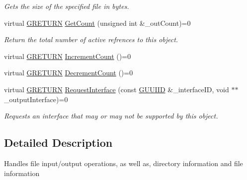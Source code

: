 \begin{DoxyCompactItemize}
\begin{DoxyCompactList}\small\item\em Gets the size of the specified file in bytes. \end{DoxyCompactList}\item 
\hypertarget{class_g_w_1_1_c_o_r_e_1_1_g_interface_a80f212dcdf60202cf9da49405863d1d5}{}\label{class_g_w_1_1_c_o_r_e_1_1_g_interface_a80f212dcdf60202cf9da49405863d1d5} 
virtual \hyperlink{namespace_g_w_a69b1aaebac1cac8049825f035884c95b}{G\+R\+E\+T\+U\+RN} \hyperlink{class_g_w_1_1_c_o_r_e_1_1_g_interface_a80f212dcdf60202cf9da49405863d1d5}{Get\+Count} (unsigned int \&\+\_\+out\+Count)=0
\begin{DoxyCompactList}\small\item\em Return the total number of active refrences to this object. \end{DoxyCompactList}\item 
virtual \hyperlink{namespace_g_w_a69b1aaebac1cac8049825f035884c95b}{G\+R\+E\+T\+U\+RN} \hyperlink{class_g_w_1_1_c_o_r_e_1_1_g_interface_a3e04e58eef4f3e3f56ff7fb751194c37}{Increment\+Count} ()=0
\item 
virtual \hyperlink{namespace_g_w_a69b1aaebac1cac8049825f035884c95b}{G\+R\+E\+T\+U\+RN} \hyperlink{class_g_w_1_1_c_o_r_e_1_1_g_interface_af6924e12b14f217b518fc91c63d9703d}{Decrement\+Count} ()=0
\item 
\hypertarget{class_g_w_1_1_c_o_r_e_1_1_g_interface_ab1414aa07bca310a824ee01a91657ad0}{}\label{class_g_w_1_1_c_o_r_e_1_1_g_interface_ab1414aa07bca310a824ee01a91657ad0} 
virtual \hyperlink{namespace_g_w_a69b1aaebac1cac8049825f035884c95b}{G\+R\+E\+T\+U\+RN} \hyperlink{class_g_w_1_1_c_o_r_e_1_1_g_interface_ab1414aa07bca310a824ee01a91657ad0}{Request\+Interface} (const \hyperlink{struct_g_w_1_1_g_u_u_i_i_d}{G\+U\+U\+I\+ID} \&\+\_\+interface\+ID, void $\ast$$\ast$\+\_\+output\+Interface)=0
\begin{DoxyCompactList}\small\item\em Requests an interface that may or may not be supported by this object. \end{DoxyCompactList}\end{DoxyCompactItemize}


\subsection{Detailed Description}
Handles file input/output operations, as well as, directory information and file information 

